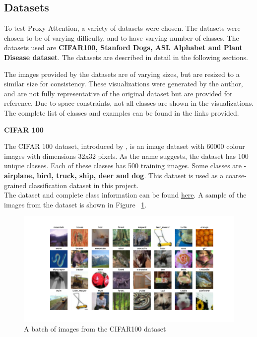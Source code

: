 \subsection{Datasets}
To test Proxy Attention, a variety of datasets were chosen. The datasets were chosen to be of varying difficulty, and to have varying number of classes. The datasets used are \textbf{CIFAR100, Stanford Dogs, ASL Alphabet and Plant Disease dataset}. The datasets are described in detail in the following sections.

The images provided by the datasets are of varying sizes, but are resized to a similar size for consistency. These visualizations were generated by the author, and are not fully representative of the original dataset but are provided for reference. Due to space constraints, not all classes are shown in the visualizations. The complete list of classes and examples can be found in the links provided.

\textbf{CIFAR 100}

The CIFAR 100 dataset, introduced by \cite{krizhevskyLearningMultipleLayers}, is an image dataset with 60000 colour images with dimensions 32x32 pixels. As the name suggests, the dataset has 100 unique classes. Each of these classes has 500 training images. Some classes are - \textbf{airplane, bird, truck, ship, deer and dog}. This dataset is used as a coarse-grained classification dataset in this project.\\
The dataset and complete class information can be found \href{https://www.kaggle.com/datasets/fedesoriano/cifar100}{here}.
A sample of the images from the dataset is shown in Figure ~\ref{fig:cifar100}.

\begin{figure}[!htb]
    \centering
    \includegraphics[width=1\textwidth]{images/cifar100.pdf}
    \caption{A batch of images from the CIFAR100 dataset}
    \label{fig:cifar100}
\end{figure}

